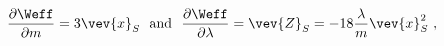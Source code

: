 \begin{equation}
\frac{\partial \Weff}{\partial m} = 3 \vev{x}_S
~~ \mathrm{and} ~~  \frac{\partial \Weff}{\partial \lambda} 
= \vev{Z}_S = -18 \frac{\lambda}{m} \vev{x}_S^2 ~,
\end{equation}

